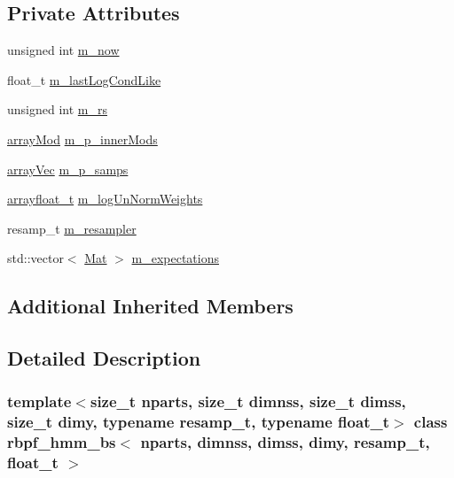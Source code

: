 \subsection*{Private Attributes}
\begin{DoxyCompactItemize}
\item 
unsigned int \hyperlink{classrbpf__hmm__bs_a9cc25241290c1a51a9b1c5c945ece110}{m\+\_\+now}
\item 
float\+\_\+t \hyperlink{classrbpf__hmm__bs_a90f0c7600229734cb3e5927685f63995}{m\+\_\+last\+Log\+Cond\+Like}
\item 
unsigned int \hyperlink{classrbpf__hmm__bs_a3c6154b8e0914dd042d6b08cfcb7d729}{m\+\_\+rs}
\item 
\hyperlink{classrbpf__hmm__bs_aa91b72fcbb93f89eade623504eaac11b}{array\+Mod} \hyperlink{classrbpf__hmm__bs_a3065666fdfb60baf45c52018acfade99}{m\+\_\+p\+\_\+inner\+Mods}
\item 
\hyperlink{classrbpf__hmm__bs_a073f5b7f5015d394259510b20f693a19}{array\+Vec} \hyperlink{classrbpf__hmm__bs_aa7b6a726eed547f0c30d12b499d5a251}{m\+\_\+p\+\_\+samps}
\item 
\hyperlink{classrbpf__hmm__bs_aa2dd927bb65838210f0d177b360606dc}{arrayfloat\+\_\+t} \hyperlink{classrbpf__hmm__bs_a9a0c878d809b4e8b4c0f496a0eb750d1}{m\+\_\+log\+Un\+Norm\+Weights}
\item 
resamp\+\_\+t \hyperlink{classrbpf__hmm__bs_ad7b27f32a6ff8e79ff0ffd7cf6f14434}{m\+\_\+resampler}
\item 
std\+::vector$<$ \hyperlink{classrbpf__hmm__bs_aa0bd79c7ece59908ed08c51da3d67dad}{Mat} $>$ \hyperlink{classrbpf__hmm__bs_a1b92aad4ad9990aa7876a06999d1ea71}{m\+\_\+expectations}
\end{DoxyCompactItemize}
\subsection*{Additional Inherited Members}


\subsection{Detailed Description}
\subsubsection*{template$<$size\+\_\+t nparts, size\+\_\+t dimnss, size\+\_\+t dimss, size\+\_\+t dimy, typename resamp\+\_\+t, typename float\+\_\+t$>$\newline
class rbpf\+\_\+hmm\+\_\+bs$<$ nparts, dimnss, dimss, dimy, resamp\+\_\+t, float\+\_\+t $>$}

